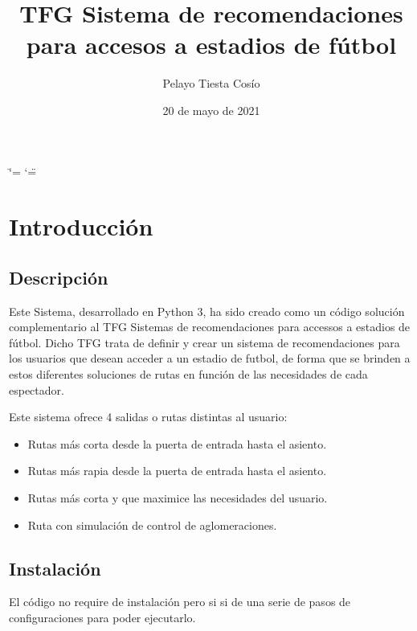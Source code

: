 \documentclass[letterpaper,10pt,spanish]{sphinxmanual}
\title{TFG \sphinxhyphen{} Sistema de recomendaciones para accesos a estadios de fútbol}
\date{20 de mayo de 2021}
\author{Pelayo Tiesta Cosío}
\begin{document}
\ifdefined\shorthandoff
  \ifnum\catcode`\=\string=\active\shorthandoff{=}\fi
  \ifnum\catcode`\"=\active{}\fi
\fi

\pagestyle{empty}
\sphinxmaketitle
\pagestyle{plain}
\sphinxtableofcontents
\pagestyle{normal}
\label{\detokenize{index::doc}}



\chapter{Introducción}
\label{\detokenize{Introduccion:introduccion}}\label{\detokenize{Introduccion::doc}}

\section{Descripción}
\label{\detokenize{Introduccion:descripcion}}
\sphinxAtStartPar
Este Sistema, desarrollado en Python 3, ha sido creado como un código solución complementario al TFG \sphinxhyphen{} Sistemas de recomendaciones para accessos a estadios de fútbol.
Dicho TFG trata de definir y crear un sistema de recomendaciones para los usuarios que desean acceder a un estadio de futbol, de forma que se brinden a estos diferentes soluciones de rutas
en función de las necesidades de cada espectador.

\sphinxAtStartPar
Este sistema ofrece 4 salidas o rutas distintas al usuario:
\begin{itemize}
\item {} 
\sphinxAtStartPar
Rutas más corta desde la puerta de entrada hasta el asiento.

\item {} 
\sphinxAtStartPar
Rutas más rapia desde la puerta de entrada hasta el asiento.

\item {} 
\sphinxAtStartPar
Rutas más corta y que maximice las necesidades del usuario.

\item {} 
\sphinxAtStartPar
Ruta con simulación de control de aglomeraciones.

\end{itemize}


\section{Instalación}
\label{\detokenize{Introduccion:instalacion}}
\sphinxAtStartPar
El código no require de instalación pero si si de una serie de pasos de configuraciones para poder ejecutarlo.
\end{document}
